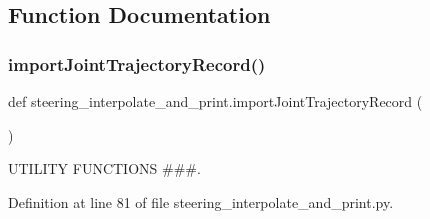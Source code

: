 \subsection{Function Documentation}
\mbox{\label{namespacesteering__interpolate__and__print_a6222ad19f86d4f86d29313c773212a98}} 
\subsubsection{\texorpdfstring{importJointTrajectoryRecord()}{importJointTrajectoryRecord()}}
{\footnotesize\ttfamily def steering\+\_\+interpolate\+\_\+and\+\_\+print.\+import\+Joint\+Trajectory\+Record (\begin{DoxyParamCaption}{ }\end{DoxyParamCaption})}



U\+T\+I\+L\+I\+TY F\+U\+N\+C\+T\+I\+O\+NS \#\#\#. 



Definition at line 81 of file steering\+\_\+interpolate\+\_\+and\+\_\+print.\+py.



